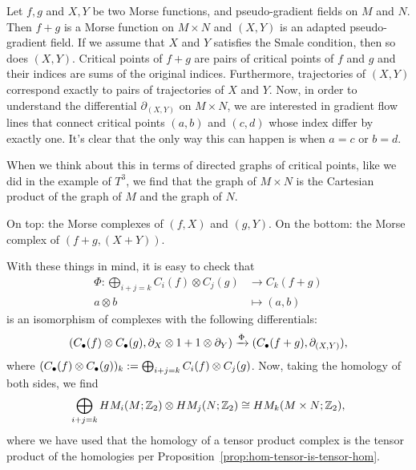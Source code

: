 \begin{myproof}
    Let $f, g$ and $X, Y$ be two Morse functions, and pseudo-gradient fields on  $M$ and  $N$.
    Then $f + g$ is a Morse function on $M \times N$ and $(X, Y)$ is an adapted pseudo-gradient field. If we assume that $X$ and  $Y$ satisfies the Smale condition, then so does $(X,Y)$.
    Critical points of $f+g$ are pairs of critical points of $f$ and $g$ and their indices are sums of the original indices.
    Furthermore, trajectories of $(X, Y)$ correspond exactly to pairs of trajectories of $X$ and $Y$.
    Now, in order to understand the differential $\partial_{(X, Y)}$ on $M \times N$, we are interested in gradient flow lines that connect critical points $(a,b)$ and  $(c,d)$ whose index differ by exactly one.
    It's clear that the only way this can happen is when $a = c$ or $b = d$.

    When we think about this in terms of directed graphs of critical points, like we did in the example of $T^{3}$, we find that the graph of $M \times N$ is the Cartesian product of the graph of $M$ and the graph of  $N$.
    \begin{marginfigure}
        \centering
        \caption{On top: the Morse complexes of $(f, X)$ and $(g, Y)$. On the bottom: the Morse complex of $(f+g, (X+Y))$.}
        \label{fig:kunneth-formula}
    \end{marginfigure}
    With these things in mind, it is easy to check that
    \begin{align*}
        \Phi: \bigoplus_{i+j = k} C_i(f) \otimes C_j(g) &\longrightarrow C_k(f+g) \\
        a \otimes b &\longmapsto (a,b)
    \end{align*}
    is an isomorphism of complexes with the following differentials:
    \[
        (C_\bul(f) \otimes C_\bul(g), \partial_X \otimes 1 + 1 \otimes \partial_Y) \xrightarrow{\Phi}   (C_\bul(f+g), \partial_{(X,Y)})
    ,\]
    where $(C_\bul(f) \otimes C_\bul(g))_k := \bigoplus_{i+j = k} C_i(f) \otimes C_j(g)$.
    Now, taking the homology of both sides, we find
    \[
        \bigoplus_{i+j = k} \HMf[i]{M; \Z_2} \otimes \HMf[j]{N; \Z_2} \cong \HMf[k]{M \times N; \Z_2}
    ,\]
    where we have used that the homology of a tensor product complex is the tensor product of the homologies per Proposition~\ref{prop:hom-tensor-is-tensor-hom}.
\end{myproof}


